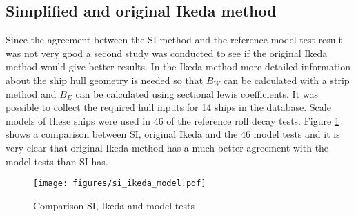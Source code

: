 \subsection{Simplified and original Ikeda method}
\label{se:si_ikeda_model}
Since the agreement between the SI-method and the reference model test result was not very good a second study was conducted to see if the original Ikeda method would give better results. In the Ikeda method more detailed information about the ship hull geometry is needed so that $B_W$ can be calculated with a strip method and $B_E$ can be calculated using sectional lewis coefficients. It was possible to collect the required hull inputs for 14 ships in the database. Scale models of these ships were used in 46 of the reference roll decay tests.
Figure \ref{fig:si_ikeda_model} shows a comparison between SI, original Ikeda and the 46 model tests and it is very clear that original Ikeda method has a much better agreement with the model tests than SI has.  

\begin{figure}[H]
    \centering
    \texttt{[image: figures/si\_ikeda\_model.pdf]}
        \vspace{-0.5cm}
    \caption{Comparison SI, Ikeda and model tests}
    \label{fig:si_ikeda_model}
\end{figure}

